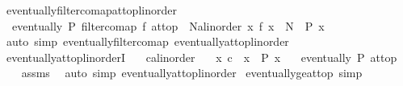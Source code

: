 \begin{isabellebody}
%
\endisadelimproof
\isanewline
{}\isamarkupfalse%
\ eventually{\isacharunderscore}{\kern0pt}filtercomap{\isacharunderscore}{\kern0pt}at{\isacharunderscore}{\kern0pt}top{\isacharunderscore}{\kern0pt}linorder{\isacharcolon}{\kern0pt}\ \isanewline
\ \ {\isachardoublequoteopen}eventually\ P\ {\isacharparenleft}{\kern0pt}filtercomap\ f\ at{\isacharunderscore}{\kern0pt}top{\isacharparenright}{\kern0pt}\ {\isasymlongleftrightarrow}\ {\isacharparenleft}{\kern0pt}{\isasymexists}N{\isacharcolon}{\kern0pt}{\isacharcolon}{\kern0pt}{\isacharprime}{\kern0pt}a{\isacharcolon}{\kern0pt}{\isacharcolon}{\kern0pt}linorder{\isachardot}{\kern0pt}\ {\isasymforall}x{\isachardot}{\kern0pt}\ f\ x\ {\isasymge}\ N\ {\isasymlongrightarrow}\ P\ x{\isacharparenright}{\kern0pt}{\isachardoublequoteclose}\isanewline
%
\isadelimproof
\ \ %
\endisadelimproof
%
\isatagproof
{}\isamarkupfalse%
\ {\isacharparenleft}{\kern0pt}auto\ simp{\isacharcolon}{\kern0pt}\ eventually{\isacharunderscore}{\kern0pt}filtercomap\ eventually{\isacharunderscore}{\kern0pt}at{\isacharunderscore}{\kern0pt}top{\isacharunderscore}{\kern0pt}linorder{\isacharparenright}{\kern0pt}%
\endisatagproof
{\isafoldproof}%
%
\isadelimproof
\isanewline
%
\endisadelimproof
\isanewline
{}\isamarkupfalse%
\ eventually{\isacharunderscore}{\kern0pt}at{\isacharunderscore}{\kern0pt}top{\isacharunderscore}{\kern0pt}linorderI{\isacharcolon}{\kern0pt}\isanewline
\ \ \ c{\isacharcolon}{\kern0pt}{\isacharcolon}{\kern0pt}{\isachardoublequoteopen}{\isacharprime}{\kern0pt}a{\isacharcolon}{\kern0pt}{\isacharcolon}{\kern0pt}linorder{\isachardoublequoteclose}\isanewline
\ \ \ {\isachardoublequoteopen}{\isasymAnd}x{\isachardot}{\kern0pt}\ c\ {\isasymle}\ x\ {\isasymLongrightarrow}\ P\ x{\isachardoublequoteclose}\isanewline
\ \ \ {\isachardoublequoteopen}eventually\ P\ at{\isacharunderscore}{\kern0pt}top{\isachardoublequoteclose}\isanewline
%
\isadelimproof
\ \ %
\endisadelimproof
%
\isatagproof
{}\isamarkupfalse%
\ assms\ \isamarkupfalse%
\ {\isacharparenleft}{\kern0pt}auto\ simp{\isacharcolon}{\kern0pt}\ eventually{\isacharunderscore}{\kern0pt}at{\isacharunderscore}{\kern0pt}top{\isacharunderscore}{\kern0pt}linorder{\isacharparenright}{\kern0pt}%
\endisatagproof
{\isafoldproof}%
%
\isadelimproof
\isanewline
%
\endisadelimproof
\isanewline
{}\isamarkupfalse%
\ eventually{\isacharunderscore}{\kern0pt}ge{\isacharunderscore}{\kern0pt}at{\isacharunderscore}{\kern0pt}top\ {\isacharbrackleft}{\kern0pt}simp{\isacharbrackright}{\kern0pt}{\isacharcolon}{\kern0pt}\isanewline

\end{isabellebody}

